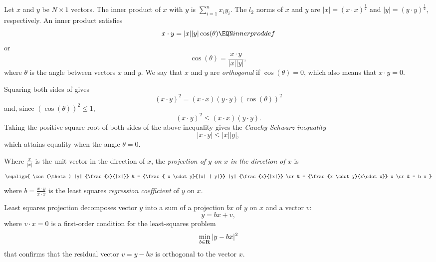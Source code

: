 \label{appc1}%
Let $x$ and $y$ be  $N \times 1$ vectors. The inner product of $x$ with $y$ is $\sum_{i=1}^n x_i y_i$.  The $l_2$ norms of $x$ and $y$
are $| x| %
 = (x \cdot x)^{\frac{1}{2}}  $ and $|y| %
 = (y \cdot y)^{\frac{1}{2}}$, respectively.
 An inner product satisfies
$$ x \cdot y = |x| |y| \cos (\theta ) \EQN innerproddef $$
or
$$ \cos (\theta) = {\frac{x \cdot y}{|x| |y|}} , $$
where $\theta$ is the angle between vectors $x$ and $y$. We say that $x$ and $y$ are {\it orthogonal\/} if $\cos(\theta) = 0$, which also
means that $ x \cdot y =0$.
%
%

Squaring both sides of   gives
$$ (x \cdot y)^2  = (x\cdot x) (y \cdot y) (\cos(\theta))^2  $$
and, since $(\cos(\theta))^2  \leq 1$,
$$ (x \cdot y)^2 \leq  (x\cdot x) (y \cdot y) .$$
Taking the positive square root  of both sides of the above inequality
gives the {\it  Cauchy-Schwarz inequality\/}
$$ | x \cdot y | \leq |x| | y |, $$
which attains  equality when the angle $\theta =0$.

%

Where ${\frac{x}{|x|}}$ is the unit vector in the direction of $x$, the {\it projection of $y$ on $x$ in the direction of $x$\/} is
$$ \eqalign{ \cos(\theta) |y| {\frac{x}{|x|}} & = {\frac{ x \cdot y}{|x| | y|}} |y| {\frac{x}{|x|}} \cr
                         & = {\frac{x \cdot y}{x\cdot x}} x \cr
                         & = b x } $$
where
$ b =  {\frac{x \cdot y}{x \cdot x} } $
is the least squares {\it regression coefficient\/} of $y$ on $x$.

Least squares  projection decomposes   vector $y$ into  a sum of a  projection $b x$ of $y$  on $x$ and a vector $v$:
$$ y = b x + v , $$
where $v \cdot x =0$  is a first-order condition for the least-squares  problem
$$ \min_{b \in {\bf R}} | y - b x |^2 $$
that confirms that the residual vector  $v = y - b x$ is orthogonal to the vector $x$.

